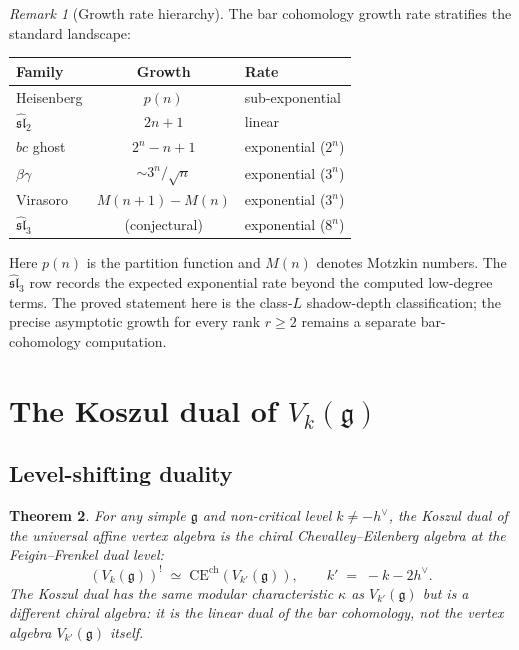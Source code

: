 \documentclass[11pt]{article}
\theoremstyle{plain}
\newtheorem{theorem}{Theorem}[section]
\theoremstyle{definition}
\theoremstyle{remark}
\newtheorem{remark}[theorem]{Remark}
\newcommand{\fg}{\mathfrak{g}}
\newcommand{\fsl}{\mathfrak{sl}}
\newcommand{\CE}{\mathrm{CE}}
\numberwithin{equation}{section}
\begin{document}
\begin{remark}[Growth rate hierarchy]\label{rem:growth}
The bar cohomology growth rate stratifies the standard
landscape:
\begin{center}
\renewcommand{\arraystretch}{1.3}
\begin{tabular}{lcl}
\toprule
\textbf{Family} & \textbf{Growth} & \textbf{Rate} \\
\midrule
Heisenberg & $p(n)$ & sub-exponential \\
$\widehat{\fsl}_2$ & $2n + 1$ & linear \\
$bc$ ghost & $2^n - n + 1$ & exponential ($2^n$) \\
$\beta\gamma$ & $\sim 3^n/\sqrt{n}$ & exponential ($3^n$) \\
Virasoro & $M(n{+}1)-M(n)$ & exponential ($3^n$) \\
$\widehat{\fsl}_3$ & (conjectural) & exponential ($8^n$) \\
\bottomrule
\end{tabular}
\end{center}
Here \(p(n)\) is the partition function and \(M(n)\) denotes Motzkin
numbers. The \(\widehat{\fsl}_3\) row records the expected exponential
rate beyond the computed low-degree terms. The proved statement here is
the class-\(L\) shadow-depth classification; the precise asymptotic
growth for every rank \(r\ge2\) remains a separate bar-cohomology
computation.
\end{remark}


\section{The Koszul dual of \texorpdfstring{$V_k(\fg)$}{Vk(g)}}
\label{sec:koszul-dual}

\subsection{Level-shifting duality}

\begin{theorem}\label{thm:koszul-dual-km}
For any simple $\fg$ and non-critical level $k \neq -h^\vee$,
the Koszul dual of the universal affine vertex algebra is the
chiral Chevalley--Eilenberg algebra at the Feigin--Frenkel
dual level:
\begin{equation}\label{eq:koszul-dual-km}
(V_k(\fg))^!
\;\simeq\;
\CE^{\mathrm{ch}}(V_{k'}(\fg)),
\qquad k' \;=\; -k - 2h^\vee.
\end{equation}
The Koszul dual has the same modular characteristic
$\kappa$ as $V_{k'}(\fg)$ but is a different chiral algebra:
it is the linear dual of the bar cohomology, not the
vertex algebra $V_{k'}(\fg)$ itself.
\end{theorem}
\end{document}
